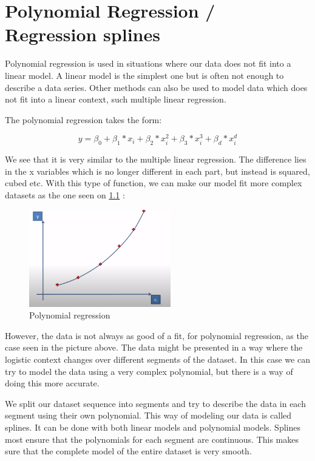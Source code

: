 
\chapter{Polynomial Regression / Regression splines}

Polynomial regression is used in situations where our data does not fit into a linear model. A linear model is the simplest one but is often not enough to describe a data series. Other methods can also be used to model data which does not fit into a linear context, such multiple linear regression. 

The polynomial regression takes the form:

\begin{equation} \label{eq:2}
y = \beta_0 + \beta_1 * x_i + \beta_2 * x_i^2 + \beta_3 * x_i^3 + \beta_d * x_i^d  
\end{equation}

We see that it is very similar to the multiple linear regression. The difference lies in the x variables which is no longer different in each part, but instead is squared, cubed etc. With this type of function, we can make our model fit more complex datasets as the one seen on \cref{fig:poly_reg} :

\begin{figure}[H]
	\centering
	\includegraphics[width=0.55\textwidth]{Img/poly_reg.PNG}
	\caption{Polynomial regression}
	\label{fig:poly_reg}
\end{figure} 

However, the data is not always as good of a fit, for polynomial regression, as the case seen in the picture above. The data might be presented in a way where the logistic context changes over different segments of the dataset. In this case we can try to model the data using a very complex polynomial, but there is a way of doing this more accurate. 

We split our dataset sequence into segments and try to describe the data in each segment using their own polynomial. This way of modeling our data is called splines. It can be done with both linear models and polynomial models. Splines most ensure that the polynomials for each segment are continuous. This makes sure that the complete model of the entire dataset is very smooth. 
